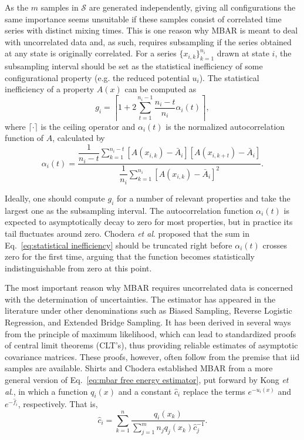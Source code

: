 \documentclass[aip,jcp,reprint,amsmath,amssymb]{revtex4-1}
\begin{document}
As the $m$ samples in $\mathcal S$ are generated independently, giving all configurations the same importance seems unsuitable if these samples consist of correlated time series with distinct mixing times. This is one reason why MBAR is meant to deal with uncorrelated data and, as such, requires subsampling if the series obtained at any state is originally correlated.\cite{Shirts_2008} For a series $\{x_{i,k}\}_{k=1}^{n_i}$ drawn at state $i$, the subsampling interval should be set as the statistical inefficiency of some configurational property (e.g. the reduced potential $u_i$). The statistical inefficiency of a property $A(x)$ can be computed as\cite{Chodera_2007}
\begin{equation}
\label{eq:statistical inefficiency}
g_i = \left\lceil 1 + 2 \sum\limits_{t=1}^{n_i-1} \frac{n_i - t}{n_i} \alpha_i(t) \right\rceil,
\end{equation}
where $\lceil \cdot \rceil$ is the ceiling operator and $\alpha_i(t)$ is the normalized autocorrelation function of $A$, calculated by
\begin{equation*}
\alpha_i(t) = \frac{\dfrac{1}{n_i - t} \sum\limits_{k=1}^{n_i-t} [A(x_{i,k}) - \bar A_i][A(x_{i,k+t}) - \bar A_i]}{\dfrac{1}{n_i} \sum\limits_{k=1}^{n_i} [A(x_{i,k}) - \bar A_i]^2}.
\end{equation*}

Ideally, one should compute $g_i$ for a number of relevant properties and take the largest one as the subsampling interval.\cite{Shirts_2008} The autocorrelation function $\alpha_i(t)$ is expected to asymptotically decay to zero for most properties, but in practice its tail fluctuates around zero. Chodera \textit{et al}.\cite{Chodera_2007} proposed that the sum in Eq.~\eqref{eq:statistical inefficiency} should be truncated right before $\alpha_i(t)$ crosses zero for the first time, arguing that the function becomes statistically indistinguishable from zero at this point.

The most important reason why MBAR requires uncorrelated data is concerned with the determination of uncertainties. The estimator has appeared in the literature under other denominations such as Biased Sampling,\cite{Vardi_1985, *Gill_1988} Reverse Logistic Regression,\cite{Geyer_1994} and Extended Bridge Sampling.\cite{Meng_1996, Kong_2003, Tan_2004} It has been derived in several ways from the principle of maximum likelihood, which can lead to standardized proofs of central limit theorems (CLT's), thus providing reliable estimates of asymptotic covariance matrices.\cite{Pawitan_2001, Greene_2012} These proofs, however, often follow from the premise that iid samples are available. Shirts and Chodera\cite{Shirts_2008} established MBAR from a more general version of Eq.~\eqref{eq:mbar free energy estimator}, put forward by Kong \textit{et al}.,\cite{Kong_2003} in which a function $q_i(x)$ and a constant $\hat c_i$ replace the terms $e^{-u_i(x)}$ and $e^{-\hat f_i}$, respectively. That is,
\begin{equation}
\label{eq:kong et al estimator}
\hat c_i = \sum_{k=1}^n \frac{q_i(x_k)}{\sum_{j=1}^m n_j q_j(x_k) \hat c_j^{-1}}.
\end{equation}
\end{document}

